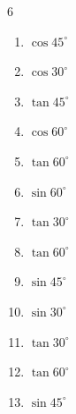 \begin{multicols}{6}
\begin{enumerate}
\columnbreak %

  \item $\displaystyle \cos{45^\circ}$


  \item $\displaystyle \cos{30^\circ}$


  \item $\displaystyle \tan{45^\circ}$

        \phantom{$\displaystyle =1$}

  \item $\displaystyle \cos{60^\circ}$


  \item $\displaystyle \tan{60^\circ}$


  \item $\displaystyle \sin{60^\circ}$


  \item $\displaystyle \tan{30^\circ}$


  \item $\displaystyle \tan{60^\circ}$


  \item $\displaystyle \sin{45^\circ}$


  \item $\displaystyle \sin{30^\circ}$


  \item $\displaystyle \tan{30^\circ}$


  \item $\displaystyle \tan{60^\circ}$


  \item $\displaystyle \sin{45^\circ}$


\end{enumerate}
\end{multicols}
